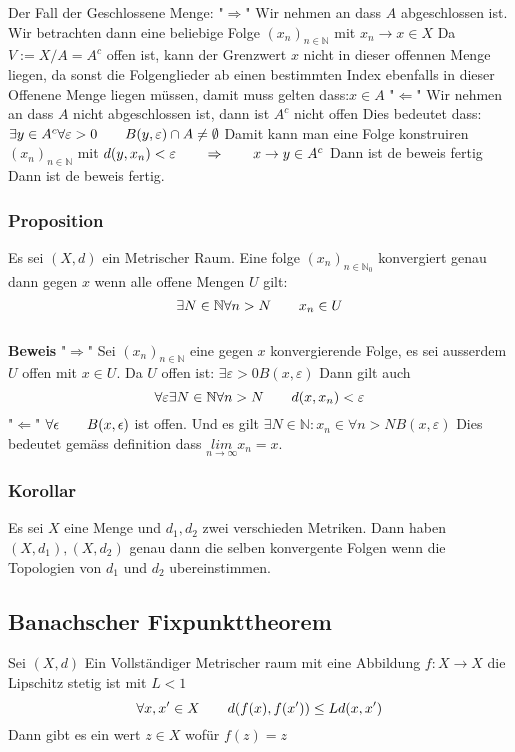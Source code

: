 \documentclass{article}
\newcommand{\mspc}{\hspace{0.7cm}}
\newcommand{\korollar}[1]{\subsubsection*{Korollar {#1}}}
\newcommand{\beweis}{\\\textbf{Beweis }}
\newcommand{\proposition}[1]{\subsubsection*{Proposition {#1}}}
\begin{document}
Der Fall der Geschlossene Menge:\newline
"$\Rightarrow$" Wir nehmen an dass $A$ abgeschlossen ist. Wir betrachten dann eine beliebige Folge $(x_n)_{n\in\mathbb{N}}$ mit $x_n\rightarrow x\in X$ Da $V:=X/A=A^c$ offen ist, kann der Grenzwert $x$ nicht in dieser offennen Menge liegen, da sonst die Folgenglieder ab einen bestimmten Index ebenfalls in dieser Offenene Menge liegen müssen, damit muss gelten dass:$x\in A$\newline
"$\Leftarrow$" Wir nehmen an dass $A$ nicht abgeschlossen ist, dann ist $A^c$ nicht offen Dies bedeutet dass: $\exists y\in A^c \forall \varepsilon>0 \mspc B(y,\varepsilon) \cap A \neq \emptyset$ Damit kann man eine Folge konstruiren 
$(x_n)_{n\in\mathbb{N}}$ mit $d(y,x_n)<\varepsilon \mspc \Rightarrow\mspc x\rightarrow y\in A^c$ Dann ist de beweis fertig Dann ist de beweis fertig.
\proposition{} Es sei $(X,d)$ ein Metrischer Raum. Eine folge $(x_n)_{n\in\mathbb{N}_0}$ konvergiert genau dann gegen $x$ wenn alle offene Mengen $U$ gilt:\[\exists N\in \mathbb{N}\forall n>N\mspc x_n\in U\]
\beweis
"$\Rightarrow$" Sei $(x_n)_{n\in\mathbb{N}}$ eine gegen $x$ konvergierende Folge, es sei ausserdem $U$ offen mit $x\in U$. Da $U$ offen ist: $\exists \varepsilon >0 B(x,\varepsilon)$ Dann gilt auch \[\forall \varepsilon \exists N\in\mathbb{N} \forall n>N \mspc d(x,x_n)<\varepsilon\]
\newline
"$\Leftarrow$" $\forall \epsilon \mspc B(x, \epsilon)$ ist offen. Und es gilt $\exists N\in\mathbb{N} : x_n\in\forall n>N B(x, \varepsilon)$ Dies bedeutet gemäss definition dass $\underset{n\rightarrow\infty}{lim} x_n=x$. 
\korollar{} Es sei $X$ eine Menge und $d_1, d_2$ zwei verschieden Metriken. Dann haben $(X,d_1), (X, d_2)$ genau dann die selben konvergente Folgen wenn die Topologien von $d_1$ und $d_2$ ubereinstimmen. 
\subsection{Banachscher Fixpunkttheorem}
Sei $(X,d)$ Ein Vollständiger Metrischer raum mit eine Abbildung $f:X\rightarrow X$ die Lipschitz stetig ist mit $L<1$\[\forall x,x'\in X\mspc d(f(x),f(x'))\le Ld(x,x')\]
Dann gibt es ein wert $z\in X$ wofür $f(z)=z$
\end{document}
